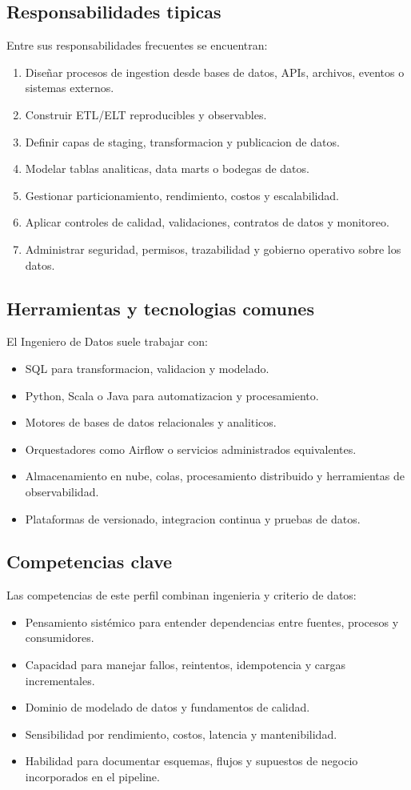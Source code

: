 \documentclass[12pt]{article}
\begin{document}
\subsection{Responsabilidades tipicas}
Entre sus responsabilidades frecuentes se encuentran:
\begin{enumerate}[label=\textbf{I\arabic*.}, leftmargin=*]
\item Diseñar procesos de ingestion desde bases de datos, APIs, archivos, eventos o sistemas externos.
\item Construir ETL/ELT reproducibles y observables.
\item Definir capas de staging, transformacion y publicacion de datos.
\item Modelar tablas analiticas, data marts o bodegas de datos.
\item Gestionar particionamiento, rendimiento, costos y escalabilidad.
\item Aplicar controles de calidad, validaciones, contratos de datos y monitoreo.
\item Administrar seguridad, permisos, trazabilidad y gobierno operativo sobre los datos.
\end{enumerate}

\subsection{Herramientas y tecnologias comunes}
El Ingeniero de Datos suele trabajar con:
\begin{itemize}[leftmargin=*]
\item SQL para transformacion, validacion y modelado.
\item Python, Scala o Java para automatizacion y procesamiento.
\item Motores de bases de datos relacionales y analiticos.
\item Orquestadores como Airflow o servicios administrados equivalentes.
\item Almacenamiento en nube, colas, procesamiento distribuido y herramientas de observabilidad.
\item Plataformas de versionado, integracion continua y pruebas de datos.
\end{itemize}

\subsection{Competencias clave}
Las competencias de este perfil combinan ingenieria y criterio de datos:
\begin{itemize}[leftmargin=*]
\item Pensamiento sistémico para entender dependencias entre fuentes, procesos y consumidores.
\item Capacidad para manejar fallos, reintentos, idempotencia y cargas incrementales.
\item Dominio de modelado de datos y fundamentos de calidad.
\item Sensibilidad por rendimiento, costos, latencia y mantenibilidad.
\item Habilidad para documentar esquemas, flujos y supuestos de negocio incorporados en el pipeline.
\end{itemize}
\end{document}

